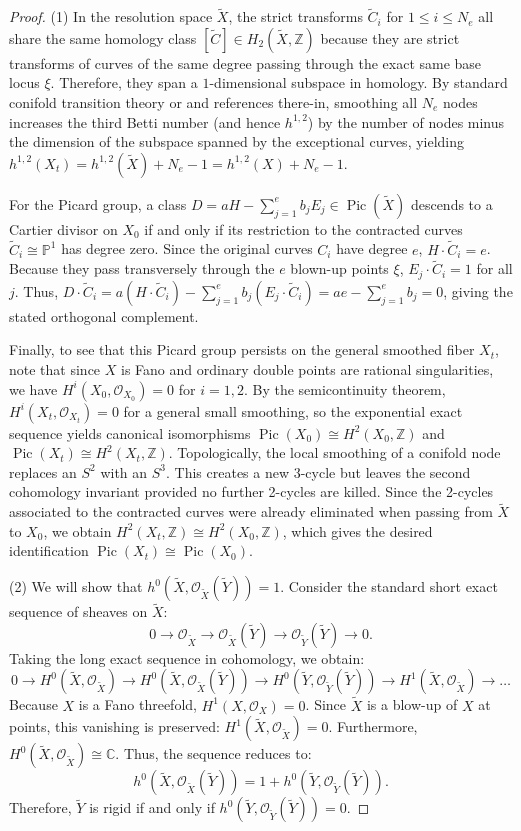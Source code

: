 \documentclass[11pt]{article}
\theoremstyle{definition}
\newcommand{\OO}{\mathcal{O}}
\newcommand{\C}{\mathbb{C}}
\newcommand{\PP}{\mathbb{P}}
\newcommand{\Z}{\mathbb{Z}}
\DeclareMathOperator{\Pic}{Pic}
\begin{document}
\begin{proof}
(1) In the resolution space $\tilde{X}$, the strict transforms $\tilde{C}_i$ for $1 \le i \le N_e$ all share the same homology class $[\tilde{C}] \in H_2(\tilde{X}, \Z)$ because they are strict transforms of curves of the same degree passing through the exact same base locus $\xi$. Therefore, they span a $1$-dimensional subspace in homology. By standard conifold transition theory \cite{C83b,F86} or \cite[Prop. 4.6]{C25} and references there-in, smoothing all $N_e$ nodes increases the third Betti number (and hence $h^{1,2}$) by the number of nodes minus the dimension of the subspace spanned by the exceptional curves, yielding $h^{1,2}(X_t) = h^{1,2}(\tilde{X}) + N_e - 1 = h^{1,2}(X) + N_e - 1$.

For the Picard group, a class $D = aH - \sum_{j=1}^e b_j E_j \in \Pic(\tilde{X})$ descends to a Cartier divisor on $X_0$ if and only if its restriction to the contracted curves $\tilde{C}_i \cong \PP^1$ has degree zero. Since the original curves $C_i$ have degree $e$, $H \cdot \tilde{C}_i = e$. Because they pass transversely through the $e$ blown-up points $\xi$, $E_j \cdot \tilde{C}_i = 1$ for all $j$. Thus, $D \cdot \tilde{C}_i = a(H \cdot \tilde{C}_i) - \sum_{j=1}^e b_j (E_j \cdot \tilde{C}_i) = ae - \sum_{j=1}^e b_j = 0$, giving the stated orthogonal complement.

Finally, to see that this Picard group persists on the general smoothed fiber $X_t$, note that since $X$ is Fano and ordinary double points are rational singularities, we have $H^i(X_0, \OO_{X_0}) = 0$ for $i=1,2$. By the semicontinuity theorem, $H^i(X_t, \OO_{X_t}) = 0$ for a general small smoothing, so the exponential exact sequence yields canonical isomorphisms $\Pic(X_0) \cong H^2(X_0, \Z)$ and $\Pic(X_t) \cong H^2(X_t, \Z)$. Topologically, the local smoothing of a conifold node replaces an $S^2$ with an $S^3$. This creates a new 3-cycle but leaves the second cohomology invariant provided no further 2-cycles are killed. Since the 2-cycles associated to the contracted curves were already eliminated when passing from $\tilde{X}$ to $X_0$, we obtain $H^2(X_t, \Z) \cong H^2(X_0, \Z)$, which gives the desired identification $\Pic(X_t) \cong \Pic(X_0)$.

(2) We will show that $h^0(\tilde{X}, \OO_{\tilde{X}}(\tilde{Y})) = 1$. Consider the standard short exact sequence of sheaves on $\tilde{X}$:
\[
0 \to \OO_{\tilde{X}} \to \OO_{\tilde{X}}(\tilde{Y}) \to \OO_{\tilde{Y}}(\tilde{Y}) \to 0.
\]
Taking the long exact sequence in cohomology, we obtain:
\[
0 \to H^0(\tilde{X}, \OO_{\tilde{X}}) \to H^0(\tilde{X}, \OO_{\tilde{X}}(\tilde{Y})) \to H^0(\tilde{Y}, \OO_{\tilde{Y}}(\tilde{Y})) \to H^1(\tilde{X}, \OO_{\tilde{X}}) \to \dots
\]
Because $X$ is a Fano threefold, $H^1(X, \OO_X) = 0$. Since $\tilde{X}$ is a blow-up of $X$ at points, this vanishing is preserved: $H^1(\tilde{X}, \OO_{\tilde{X}}) = 0$. Furthermore, $H^0(\tilde{X}, \OO_{\tilde{X}}) \cong \C$. Thus, the sequence reduces to:
\[
h^0(\tilde{X}, \OO_{\tilde{X}}(\tilde{Y})) = 1 + h^0(\tilde{Y}, \OO_{\tilde{Y}}(\tilde{Y})).
\]
Therefore, $\tilde{Y}$ is rigid if and only if $h^0(\tilde{Y}, \OO_{\tilde{Y}}(\tilde{Y})) = 0$. 


\end{proof}
\end{document}
